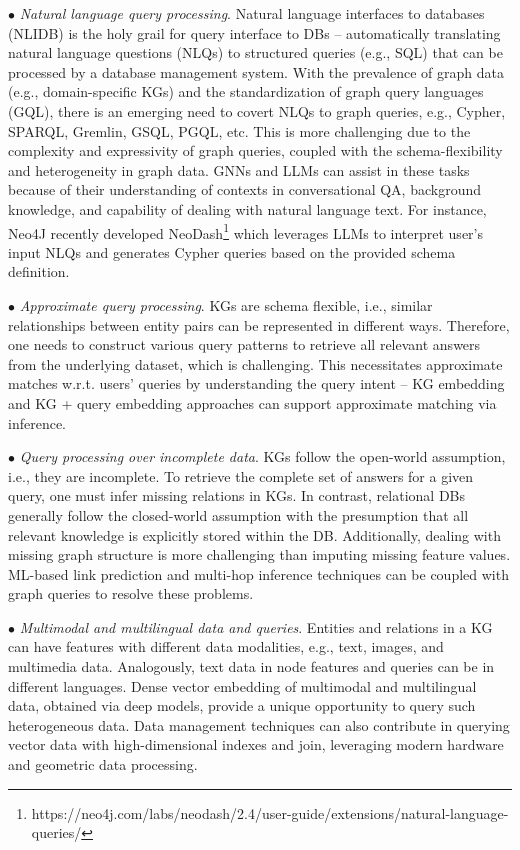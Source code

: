 \documentclass{sig-alternate-10pt}
\begin{document}
\noindent $\bullet$ {\em Natural language query processing}. Natural language interfaces to databases (NLIDB) is the holy grail for query interface to DBs -- automatically translating natural language questions (NLQs) to structured queries (e.g., SQL) that can be processed by a database management system. With the prevalence of graph data (e.g., domain-specific KGs) and the standardization of graph query languages (GQL), there is an emerging need to covert NLQs to graph queries, e.g., Cypher, SPARQL, Gremlin, GSQL, PGQL, etc. This is more challenging due to the complexity and expressivity of graph queries, coupled with the schema-flexibility and heterogeneity in graph data. GNNs and LLMs can assist in these tasks because of their understanding of contexts in conversational QA, background knowledge, and capability of dealing with natural language text. For instance, Neo4J recently developed NeoDash\footnote{\scriptsize{{https://neo4j.com/labs/neodash/2.4/user-guide/extensions/natural-language-queries/}}} which leverages LLMs to interpret user's input NLQs and generates Cypher queries based on the provided schema definition.


\noindent $\bullet$ {\em Approximate query processing}.
KGs are schema flexible, i.e., similar relationships between entity pairs can be represented in different ways. Therefore, one needs to construct various query patterns to retrieve all relevant answers from the underlying dataset, which is challenging. This necessitates approximate matches w.r.t. users' queries by understanding the query intent -- KG embedding and KG + query embedding approaches can support approximate matching via inference.


\noindent $\bullet$ {\em Query processing over incomplete data}.
KGs follow the open-world assumption, i.e., they are incomplete. To retrieve the complete set of answers for a given query, one must infer missing relations in KGs. In contrast, relational DBs generally follow the closed-world assumption with the presumption that all relevant knowledge is explicitly stored within the DB. Additionally, dealing with missing graph structure is more challenging than imputing missing feature values. ML-based link prediction and multi-hop inference techniques can be coupled with graph queries to resolve these problems.


\noindent $\bullet$ {\em Multimodal and multilingual data and queries}.
Entities and relations in a KG can have features with different data modalities, e.g., text, images, and multimedia data. Analogously, text data in node features and queries can be in different languages. Dense vector embedding of multimodal and multilingual data, obtained via deep models, provide a unique opportunity to query such heterogeneous data. Data management techniques can also contribute in querying vector data with high-dimensional indexes and join, leveraging modern hardware and geometric data processing.
\end{document}
